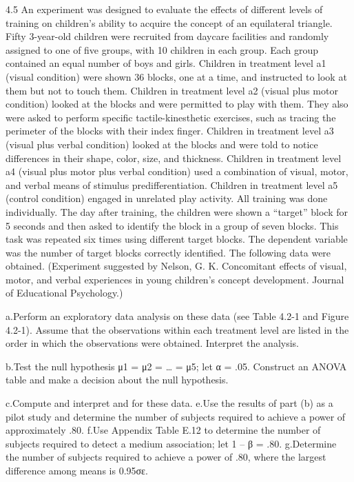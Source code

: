 \documentclass[
]{article}
\begin{document}
4.5 An experiment was designed to evaluate the effects of different
levels of training on children's ability to acquire the concept of an
equilateral triangle. Fifty 3-year-old children were recruited from
daycare facilities and randomly assigned to one of five groups, with 10
children in each group. Each group contained an equal number of boys and
girls. Children in treatment level a1 (visual condition) were shown 36
blocks, one at a time, and instructed to look at them but not to touch
them. Children in treatment level a2 (visual plus motor condition)
looked at the blocks and were permitted to play with them. They also
were asked to perform specific tactile-kinesthetic exercises, such as
tracing the perimeter of the blocks with their index finger. Children in
treatment level a3 (visual plus verbal condition) looked at the blocks
and were told to notice differences in their shape, color, size, and
thickness. Children in treatment level a4 (visual plus motor plus verbal
condition) used a combination of visual, motor, and verbal means of
stimulus predifferentiation. Children in treatment level a5 (control
condition) engaged in unrelated play activity. All training was done
individually. The day after training, the children were shown a
``target'' block for 5 seconds and then asked to identify the block in a
group of seven blocks. This task was repeated six times using different
target blocks. The dependent variable was the number of target blocks
correctly identified. The following data were obtained. (Experiment
suggested by Nelson, G. K. Concomitant effects of visual, motor, and
verbal experiences in young children's concept development. Journal of
Educational Psychology.)

a.Perform an exploratory data analysis on these data (see Table 4.2-1
and Figure 4.2-1). Assume that the observations within each treatment
level are listed in the order in which the observations were obtained.
Interpret the analysis.

b.Test the null hypothesis μ1 = μ2 = \ldots{} = μ5; let α = .05.
Construct an ANOVA table and make a decision about the null hypothesis.

c.Compute and interpret and for these data. e.Use the results of part
(b) as a pilot study and determine the number of subjects required to
achieve a power of approximately .80. f.Use Appendix Table E.12 to
determine the number of subjects required to detect a medium
association; let 1 -- β = .80. g.Determine the number of subjects
required to achieve a power of .80, where the largest difference among
means is 0.95σε.
\end{document}
